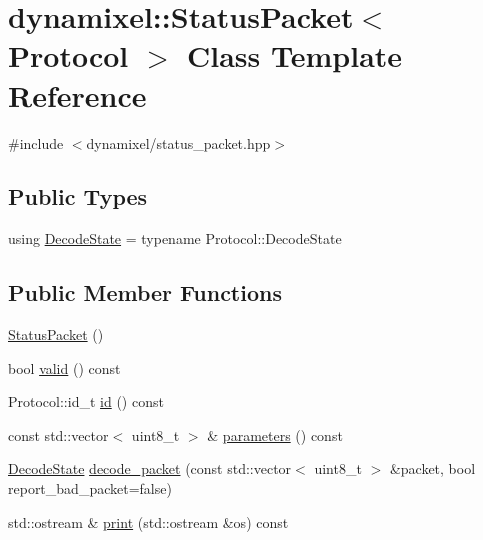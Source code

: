 \hypertarget{classdynamixel_1_1_status_packet}{}\section{dynamixel\+:\+:Status\+Packet$<$ Protocol $>$ Class Template Reference}
\label{classdynamixel_1_1_status_packet}


{\ttfamily \#include $<$dynamixel/status\+\_\+packet.\+hpp$>$}

\subsection*{Public Types}
\begin{DoxyCompactItemize}
\item 
using \hyperlink{classdynamixel_1_1_status_packet_a8503d43f735f141c2faa37aaac8abbc6}{Decode\+State} = typename Protocol\+::\+Decode\+State
\end{DoxyCompactItemize}
\subsection*{Public Member Functions}
\begin{DoxyCompactItemize}
\item 
\hyperlink{classdynamixel_1_1_status_packet_a569c906dc127b35054910ee24ac3106d}{Status\+Packet} ()
\item 
bool \hyperlink{classdynamixel_1_1_status_packet_a238434acc73f5fee202c72165119bce7}{valid} () const 
\item 
Protocol\+::id\+\_\+t \hyperlink{classdynamixel_1_1_status_packet_a10276952e07fde88f3c735e8566286a8}{id} () const 
\item 
const std\+::vector$<$ uint8\+\_\+t $>$ \& \hyperlink{classdynamixel_1_1_status_packet_a6705f215ee512e2de94f3a4108a5b008}{parameters} () const 
\item 
\hyperlink{classdynamixel_1_1_status_packet_a8503d43f735f141c2faa37aaac8abbc6}{Decode\+State} \hyperlink{classdynamixel_1_1_status_packet_afa5050d362fd97326a3114207544f735}{decode\+\_\+packet} (const std\+::vector$<$ uint8\+\_\+t $>$ \&packet, bool report\+\_\+bad\+\_\+packet=false)
\item 
std\+::ostream \& \hyperlink{classdynamixel_1_1_status_packet_a5a1e1ffbe173e1da4a0947d48150ed43}{print} (std\+::ostream \&os) const 
\end{DoxyCompactItemize}


